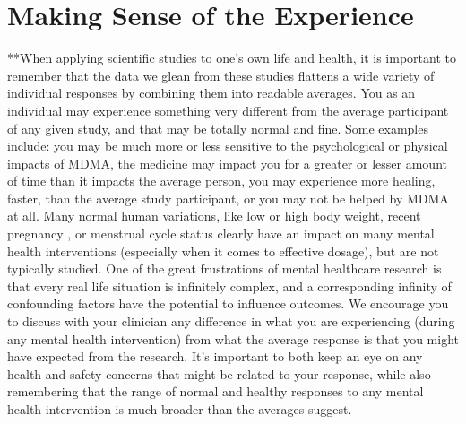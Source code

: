 \documentclass[12pt,letterpaper]{book}
\begin{document}
%
%
%
\section{Making Sense of the Experience}
\label{sectionMakingSense}
**When applying scientific studies to one's own life and health, it is important to remember that the data we glean from these studies flattens a wide variety of individual responses by combining them into readable averages. You as an individual may experience something very different from the average participant of any given study, and that may be totally normal and fine. Some examples include: you may be much more or less sensitive to the psychological or physical impacts of MDMA, the medicine may impact you for a greater or lesser amount of time than it impacts the average person, you may experience more healing, faster, than the average study participant, or you may not be helped by MDMA at all. Many normal human variations, like low or high body weight, recent pregnancy , or menstrual cycle status  clearly have an impact on many mental health interventions (especially when it comes to effective dosage), but are not typically studied. One of the great frustrations of mental healthcare research is that every real life situation is infinitely complex, and a corresponding infinity of confounding factors have the potential to influence outcomes. We encourage you to discuss with your clinician any difference in what you are experiencing (during any mental health intervention) from what the average response is that you might have expected from the research. It's important to both keep an eye on any health and safety concerns that might be related to your response, while also remembering that the range of normal and healthy responses to any mental health intervention is much broader than the averages suggest.
\end{document}
